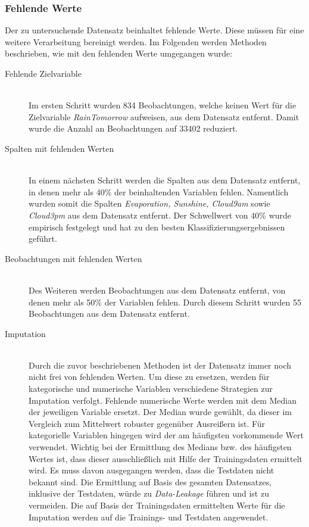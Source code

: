 \subsubsection{Fehlende Werte}
Der zu untersuchende Datensatz beinhaltet fehlende Werte. Diese müssen für eine weitere Verarbeitung bereinigt werden. Im Folgenden werden Methoden beschrieben, wie mit den fehlenden Werte umgegangen wurde:
\begin{description}
	\item[Fehlende Zielvariable]\hfill \\
	 Im ersten Schritt wurden 834 Beobachtungen, welche keinen Wert für die Zielvariable \emph{RainTomorrow} aufweisen, aus dem Datensatz entfernt. Damit wurde die Anzahl an Beobachtungen auf 33402 reduziert.
	 \item[Spalten mit fehlenden Werten]\hfill \\
	 In einem nächsten Schritt werden die Spalten aus dem Datensatz entfernt, in denen mehr als 40\% der beinhaltenden Variablen fehlen. Namentlich wurden somit die Spalten \emph{Evaporation, Sunshine, Cloud9am} sowie \emph{Cloud3pm} aus dem Datensatz entfernt. Der Schwellwert von 40\% wurde empirisch festgelegt und hat zu den besten Klassifizierungsergebnissen geführt.
	 \item[Beobachtungen mit fehlenden Werten]\hfill \\
	 Des Weiteren werden Beobachtungen aus dem Datensatz entfernt, von denen mehr als 50\% der Variablen fehlen. Durch diesem Schritt wurden 55 Beobachtungen aus dem Datensatz entfernt.
	 \item[Imputation]\hfill \\
	 Durch die zuvor beschriebenen Methoden ist der Datensatz immer noch  nicht frei von fehlenden Werten. Um diese zu ersetzen, werden für kategorische und numerische Variablen verschiedene Strategien zur Imputation verfolgt. Fehlende numerische Werte werden mit dem Median der jeweiligen Variable ersetzt. Der Median wurde gewählt, da dieser im Vergleich zum Mittelwert robuster gegenüber Ausreißern ist. Für kategorielle Variablen hingegen wird der am häufigsten vorkommende Wert verwendet. Wichtig bei der Ermittlung des Medians bzw. des häufigsten Wertes ist, dass dieser ausschließlich mit Hilfe der Trainingsdaten ermittelt wird. Es muss davon ausgegangen werden, dass die Testdaten nicht bekannt sind. Die Ermittlung auf Basis des gesamten Datensatzes, inklusive der Testdaten, würde zu \emph{Data-Leakage} führen und ist zu vermeiden. Die auf Basis der Trainingsdaten ermittelten Werte für die Imputation werden auf die Trainings- und Testdaten angewendet.
\end{description}


